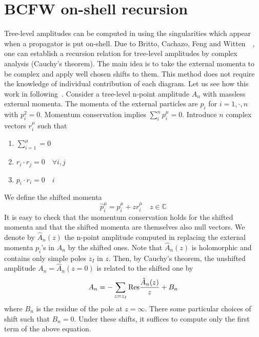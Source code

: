 \section{BCFW on-shell recursion}
Tree-level amplitudes can be computed in using the singularities which appear when a propagator is put on-shell. 
Due to Britto, Cachazo, Feng and Witten~\cite{BRITTO2005499}~\cite{PhysRevLett.94.181602}, one can establish a recursion relation for tree-level amplitudes by complex analysis (Cauchy's theorem).
The main idea is to take the external momenta to be complex and apply well chosen shifts to them.
This method does not require the knowledge of individual contribution of each diagram.
Let us see how this work in following~\cite{Elvang:2013cua}.
Consider a tree-level n-point amplitude $A_n$ with massless external momenta.
The momenta of the external particles are $p_i$ for $i=1, \cdot, n$ with $p^2_i = 0$. 
Momentum conservation implies $\sum_i^n p_i^\mu = 0$. 
Introduce $n$ complex vectors $r^{\mu}_i$ such that
\begin{enumerate}
\item $\sum_{i=1}^{\mu} = 0$
\item $r_i\cdot r_j = 0 \quad\forall i,j$
\item $p_i \cdot r_i = 0 \quad i$
\end{enumerate}
We define the shifted momenta
\begin{equation*}
\hat{p}^\mu_i = p_i^{\mu} + z r_i^{\mu} \quad z\in\mathbb{C}
\end{equation*} 
It is easy to check that the momentum conservation holds for the shifted momenta and that the shifted momenta are themselves also null vectors.
We denote by $\hat{A}_n(z)$ the n-point amplitude computed in replacing the external momenta $p_i$'s in $A_n$ by the shifted ones. 
Note that $\hat{A}_n(z)$ is holomorphic and contains only simple poles $z_I$ in $z$.
Then, by Cauchy's theorem, the unshifted amplitude $A_n = \hat{A}_n(z=0)$ is related to the shifted one by
\begin{equation}\label{residue}
A_n = - \sum_{z = z_I}\mathrm{Res}\frac{\hat{A}_n(z)}{z} + B_n
\end{equation} 
where $B_n$ is the residue of the pole at $z = \infty$.
There some particular choices of shift such that $B_n = 0$.
Under these shifts, it suffices to compute only the first term of the above equation. 
